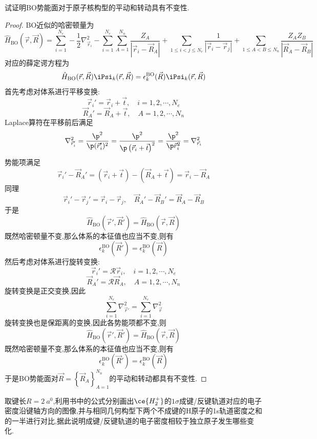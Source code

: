 \documentclass{ctexart}
\author{2400011785 蒋锦豪}
\title{\tbf{结构化学\ 第3章作业}}
\begin{document}
\maketitle
\begin{homework}[1.]
    试证明BO势能面对于原子核构型的平动和转动具有不变性.
\end{homework}
\begin{proof}
    BO近似的哈密顿量为
    \[\hat{H}_{\text{BO}}(\vec{r},\vec{R})=\sum_{i=1}^{N_e}-\dfrac12\nabla_{\vec{r}_i}^2-\sum_{i=1}^{N_e}\sum_{A=1}^{N_n}\dfrac{Z_A}{\left|\vec{r}_i-\vec{R}_A\right|}+\sum_{1\leq i<j\leq N_e}\dfrac{1}{\left|\vec{r}_i-\vec{r}_j\right|}+\sum_{1\leq A<B\leq N_n}\dfrac{Z_AZ_B}{\left|\vec{R}_A-\vec{R}_B\right|}\]
    对应的薛定谔方程为
    \[\hat{H}_{\text{BO}}(\vec{r},\vec{R})\iPsi_k(\vec{r},\vec{R})=\epsilon_k^{\text{BO}}(\vec{R})\iPsi_k(\vec{r},\vec{R})\]
    \indent 首先考虑对体系进行平移变换:
    \[\vec{r}_i'=\vec{r}_i+\vec{t},\quad i=1,2,\cdots,N_e\]
    \[\vec{R}_A'=\vec{R}_A+\vec{t},\quad A=1,2,\cdots,N_n\]
    Laplace算符在平移前后满足
    \[\nabla_{\vec{r}_i'}^2=\dfrac{\p^2}{\p(\vec{r}_i')^2}=\dfrac{\p^2}{\p\left(\vec{r}_i+\vec{t}\right)^2}=\dfrac{\p^2}{\p\vec{r}_i^2}=\nabla_{\vec{r}_i}^2\]
    势能项满足
    \[\vec{r}_i'-\vec{R}_A'=\left(\vec{r}_i+\vec{t}\right)-\left(\vec{R}_A+\vec{t}\right)=\vec{r}_i-\vec{R}_A\]
    同理
    \[\vec{r}_i'-\vec{r}_j'=\vec{r}_i-\vec{r}_j,\quad\vec{R}_A'-\vec{R}_B'=\vec{R}_A-\vec{R}_B\]
    于是
    \[\hat{H}_{\text{BO}}(\vec{r}',\vec{R}')=\hat{H}_{\text{BO}}(\vec{r},\vec{R})\]
    既然哈密顿量不变,那么体系的本征值也应当不变,则有
    \[\epsilon_k^{\text{BO}}(\vec{R}')=\epsilon_k^{\text{BO}}(\vec{R})\]
    \indent 然后考虑对体系进行旋转变换:
    \[\vec{r}_i'=\mathcal{R}\vec{r}_i,\quad i=1,2,\cdots,N_e\]
    \[\vec{R}_A'=\mathcal{R}\vec{R}_A,\quad A=1,2,\cdots,N_n\]
    旋转变换是正交变换,因此
    \[\sum_{i=1}^{N_e}\nabla_{\vec{r}'}^2=\sum_{i=1}^{N_e}\nabla_{\vec{r}}^2\]
    旋转变换也是保距离的变换,因此各势能项都不变,则
    \[\hat{H}_{\text{BO}}(\vec{r}',\vec{R}')=\hat{H}_{\text{BO}}(\vec{r},\vec{R})\]
    既然哈密顿量不变,那么体系的本征值也应当不变,则有
    \[\epsilon_k^{\text{BO}}(\vec{R}')=\epsilon_k^{\text{BO}}(\vec{R})\]
    于是BO势能面对$\vec{R}=\left\{\vec{R}_A\right\}_{A=1}^{N_n}$的平动和转动都具有不变性.
\end{proof}
\begin{homework}[2.]
    取键长$R=\SI{2}{\bohr}$,利用书中的公式分别画出$\ce{H_2^+}$的$1\sigma$成键/反键轨道对应的电子密度沿键轴方向的图像,并与相同几何构型下两个不成键的H原子的1s轨道密度之和的一半进行对比,据此说明成键/反键轨道的电子密度相较于独立原子发生哪些变化.
\end{homework}
\end{document}
